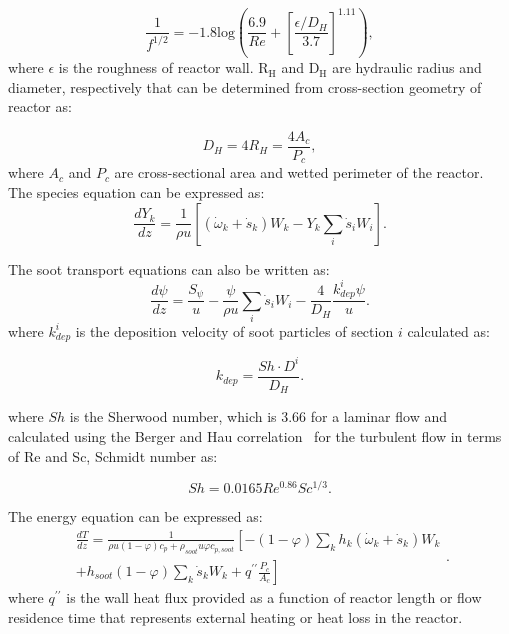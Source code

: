 \begin{equation}
	\frac{1}{f^{1/2}} = -1.8 \mathrm{log}
	\left(
		\frac{6.9}{Re}+
		\left[ \frac{\epsilon/D_H}{3.7} \right]^{1.11}
	\right)
	\label{eqn:fpfr},
\end{equation}
\noindent where $\epsilon$ is the roughness of reactor wall.
$\mathrm{R_H}$ and $\mathrm{D_H}$ are hydraulic radius and diameter, respectively that can be determined from cross-section geometry of reactor as:

\begin{equation}
	D_H = 4 R_H = \frac{4 A_c}{P_c}
	\label{eqn:RDHpfr},
\end{equation}
\noindent where $A_c$ and $P_c$ are cross-sectional area and wetted perimeter of the reactor.
The species equation can be expressed as:
\begin{equation}
	\frac{d Y_k}{d z}=\frac{1}{\rho u}\left[\left(\dot{\omega}_k+\dot{s}_k\right) W_k-Y_k \sum_i \dot{s}_i W_i\right]
	\label{eqn:speciespfr}.
\end{equation}

The soot transport equations can also be written as:
\begin{equation}
	\frac{d \psi}{d z}=
	\frac{S_{\psi}}{u}
	-\frac{\psi}{\rho u}\sum_i \dot{s}_i W_i
	-\frac{4}{D_H}\frac{k^i_{dep}\psi}{u}
	\label{eqn:sootpfr}.
\end{equation}
\noindent where $k^i_{dep}$ is the deposition velocity of soot particles of section $i$ calculated as:

\begin{equation}
	k_{dep}=
	\frac{Sh\cdot D^i}{D_H}
	\label{eqn:kdep}.
\end{equation}

\noindent where $Sh$ is the Sherwood number, which is 3.66 for a laminar flow and calculated using the Berger and Hau correlation~\citep{berger1977mass} for the turbulent flow in terms of Re and Sc, Schmidt number as:

\begin{equation}
	Sh=
	0.0165Re^{0.86} Sc^{1/3}
	\label{eqn:shdep}.
\end{equation}

The energy equation can be expressed as:
\begin{equation}
	\begin{split}
		\frac{d T}{d z}=
		\frac{1}{\rho u (1-\varphi) c_p+\rho_{soot} u \varphi 	c_{p,soot}}
		\left[
			-(1-\varphi)\sum_k h_k
			\left(
			\dot{\omega}_k+\dot{s}_k
			\right) W_k
		\right. \\
		\left.
			+h_{soot}(1-\varphi)\sum_k \dot{s}_k W_k
			+q^{\prime \prime}\frac{P_c}{A_c}
		\right]
	\end{split}
	\label{eqn:energypfr}.
\end{equation}
\noindent where $q^{\prime \prime}$ is the wall heat flux provided as a function of reactor length or flow residence time that represents external heating or heat loss in the reactor.




